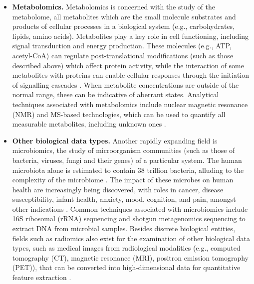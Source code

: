 \begin{itemize}
    \item   \textbf{Metabolomics.} Metabolomics is concerned with the study of the metabolome, all metabolites which are the small molecule substrates and products of cellular processes in a biological system (e.g., carbohydrates, lipids, amino acids). Metabolites play a key role in cell functioning, including signal transduction and energy production. These molecules (e.g., ATP, acetyl-CoA) can regulate post-translational modifications (such as those described above) which affect protein activity, while the interaction of some metabolites with proteins can enable cellular responses through the initiation of signalling cascades \parencite{johnson2016}. When metabolite concentrations are outside of the normal range, these can be indicative of aberrant states. Analytical techniques associated with metabolomics include nuclear magnetic resonance (NMR) and MS-based technologies, which can be used to quantify all measurable metabolites, including unknown ones \parencite{roberts2012}. 
    
    \item   \textbf{Other biological data types.} Another rapidly expanding field is microbiomics, the study of microorganism communities (such as those of bacteria, viruses, fungi and their genes) of a particular system. The human microbiota alone is estimated to contain 38 trillion bacteria, alluding to the complexity of the microbiome \parencite{sender2016}. The impact of these microbes on human health are increasingly being discovered, with roles in cancer, disease susceptibility, infant health, anxiety, mood, cognition, and pain, amongst other indications \parencite{mohajeri2018, ursell2012}. Common techniques associated with microbiomics include 16S ribosomal (rRNA) sequencing and shotgun metagenomics sequencing to extract DNA from microbial samples. Besides discrete biological entities, fields such as radiomics also exist for the examination of  other biological data types, such as medical images from radiological modalities (e.g., computed tomography (CT), magnetic resonance (MRI), positron emission tomography (PET)), that can be converted into high-dimensional data for quantitative feature extraction \parencite{gillies2016}.
\end{itemize}

